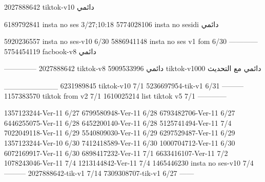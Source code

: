 2027888642 tiktok-v10
دائمي

6189792841 insta no ses
3/27;10:18
5774028106 insta no sesidi
دائمي


5920236557 insta no ses-v10
6/30
5886941148 insta no ses v1 fom
6/30
------------
5754454119 facbook-v8
دائمي


--------------
2027888642 tiktok-v8
دائمي
5909533996 tiktok-v1000
دائمي مع التحديث

__________
6231989845 tiktok-v10
7/1
5236697954-tik-v1
6/31
---------
1157383570 tiktok from v2
7/1
1610025214 list tiktok v5
7/1
------------

1357123244-Ver-11
6/27
6799580948-Ver-11
6/28
6793482706-Ver-11
6/27
6446255075-Ver-11
6/28
6452200140-Ver-11
6/28
5125741494-Ver-11
7/4
7022049118-Ver-11
6/29
5540809030-Ver-11
6/29
6297529487-Ver-11
6/29
1357123244-Ver-10
6/30
7412418589-Ver-11
6/30
1000704712-Ver-11
6/30
6072169917-Ver-11
6/30
6898417232-Ver-11
7/1
6633416107-Ver-11
7/2
1078243046-Ver-11
7/4
1213144842-Ver-11
7/4
1465446230 insta no ses-v10
7/4
---------
2027888642-tik-v1
7/14
7309308707-tik-v1
6/27
------
